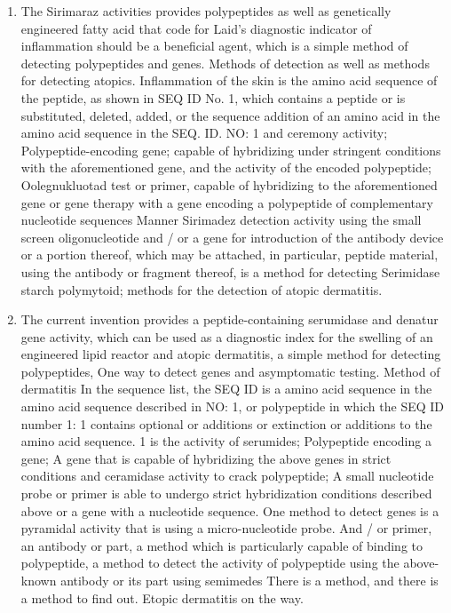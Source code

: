 \documentclass{article}
\begin{document}
\begin{enumerate}
\item 
The Sirimaraz activities provides polypeptides as well as genetically engineered fatty acid that code for Laid's diagnostic indicator of inflammation should be a beneficial agent, which is a simple method of detecting polypeptides and genes. Methods of detection as well as methods for detecting atopics. Inflammation of the skin is the amino acid sequence of the peptide, as shown in SEQ ID No. 1, which contains a peptide or is substituted, deleted, added, or the sequence addition of an amino acid in the amino acid sequence in the SEQ. ID. NO: 1 and ceremony activity; Polypeptide-encoding gene; capable of hybridizing under stringent conditions with the aforementioned gene, and the activity of the encoded polypeptide; Oolegnukluotad test or primer, capable of hybridizing to the aforementioned gene or gene therapy with a gene encoding a polypeptide of complementary nucleotide sequences Manner Sirimadez detection activity using the small screen oligonucleotide and / or a gene for introduction of the antibody device or a portion thereof, which may be attached, in particular, peptide material, using the antibody or fragment thereof, is a method for detecting Serimidase starch polymytoid; methods for the detection of atopic dermatitis.


\item 
The current invention provides a peptide-containing serumidase and denatur gene activity, which can be used as a diagnostic index for the swelling of an engineered lipid reactor and atopic dermatitis, a simple method for detecting polypeptides, One way to detect genes and asymptomatic testing. Method of dermatitis In the sequence list, the SEQ ID is a amino acid sequence in the amino acid sequence described in NO: 1, or polypeptide in which the SEQ ID number 1: 1 contains optional or additions or extinction or additions to the amino acid sequence. 1 is the activity of serumides; Polypeptide encoding a gene; A gene that is capable of hybridizing the above genes in strict conditions and ceramidase activity to crack polypeptide; A small nucleotide probe or primer is able to undergo strict hybridization conditions described above or a gene with a nucleotide sequence. One method to detect genes is a pyramidal activity that is using a micro-nucleotide probe. And / or primer, an antibody or part, a method which is particularly capable of binding to polypeptide, a method to detect the activity of polypeptide using the above-known antibody or its part using semimedes There is a method, and there is a method to find out. Etopic dermatitis on the way.




\end{enumerate}
\end{document}
